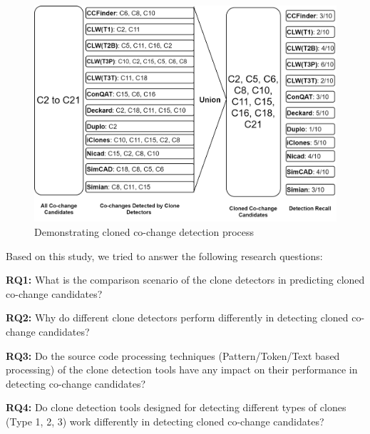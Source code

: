 \documentclass[review]{elsarticle}
\begin{document}

\vspace{4mm}
\begin{figure}
\centering
\includegraphics[width=\columnwidth] {CalculatingCC.png}
\caption{Demonstrating cloned co-change detection process}
\label{fig:CalculatingCC}
\end{figure}

Based on this study, we tried to answer the following research questions:

\vspace{0.15cm}
\noindent
\textbf{RQ1: }What is the comparison scenario of the clone detectors in predicting cloned co-change candidates?
 
\vspace{0.15cm}
\noindent
\textbf{RQ2: }Why do different clone detectors perform differently in detecting cloned co-change candidates?

\vspace{0.15cm}
\noindent
\textbf{RQ3: }Do the source code processing techniques (Pattern/Token/Text based processing) of the clone detection tools have any impact on their performance in detecting co-change candidates?

\vspace{0.15cm}
\noindent
\textbf{RQ4: }Do clone detection tools designed for detecting different types of clones (Type 1, 2, 3) work differently in detecting cloned co-change candidates?
\end{document}
